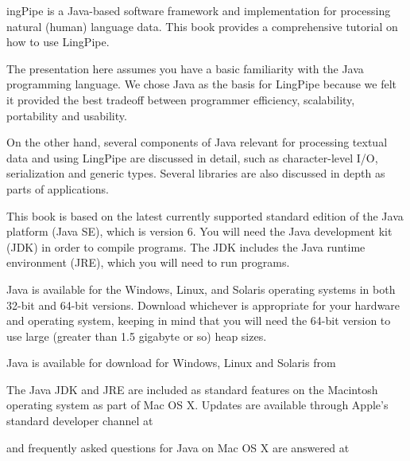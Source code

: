 
ingPipe is a Java-based software framework and
implementation for processing natural (human) language data.  This
book provides a comprehensive tutorial on how to use LingPipe.  


\noindent
The presentation here assumes you have a basic familiarity with the
Java programming language.  We chose Java as the basis for LingPipe
because we felt it provided the best tradeoff between programmer
efficiency, scalability, portability and usability.  

On the other hand, several components of Java relevant for processing
textual data and using LingPipe are discussed in detail, such as
character-level I/O, serialization and generic types.  Several
libraries are also discussed in depth as parts of applications.


\noindent
This book is based on the latest currently supported standard edition
of the Java platform (Java SE), which is version 6.  You will need the
Java development kit (JDK) in order to compile programs.  The JDK
includes the Java runtime environment (JRE), which you will need to
run programs.  


\noindent
Java is available for the Windows, Linux, and Solaris operating
systems in both 32-bit and 64-bit versions.  Download whichever is
appropriate for your hardware and operating system, keeping in mind
that you will need the 64-bit version to use large (greater than 1.5
gigabyte or so) heap sizes.

Java is available for download for Windows, Linux and Solaris from

\begin{quote}
\end{quote}

The Java JDK and JRE are included as standard features on the
Macintosh operating system as part of Mac OS X.  Updates are
available through Apple's standard developer channel at
%
\begin{quote}
\end{quote}
%
and frequently asked questions for Java on Mac OS X are answered at
%
\begin{quote}
\end{quote}

